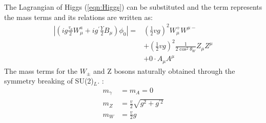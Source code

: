 The Lagrangian of Higgs (\ref{eqn:Higgs}) can be substituted and 
the term represents the mass terms and its relations are written as:
\begin{equation}
\begin{aligned}
\left|\left(i g \frac{\tau_{a}}{2} W_{\mu}^{a}+i g^{\prime} \frac{Y}{2} B_{\mu}\right) \phi_{0}\right|=&\left(\frac{1}{2} v g\right)^{2} W_{\mu}^{+} W^{\mu-} \\
&+\left(\frac{1}{2} v g\right)^{2} \frac{1}{2 \cos ^{2} \theta_{W}} Z_{\mu} Z^{\mu} \\
&+0 \cdot A_{\mu} A^{\mu}
\end{aligned}
\end{equation}
The mass terms for the $W_\pm$ and Z bosons naturally obtained through the symmetry breaking of SU(2)$_L$. :
\begin{equation}
\begin{aligned}
m_{\gamma} &=m_{A}=0 \\
m_{Z} &=\frac{v}{2} \sqrt{g^{2}+g^{\prime 2}} \\
m_{W} &=\frac{v}{2} g
\end{aligned}
\end{equation}



